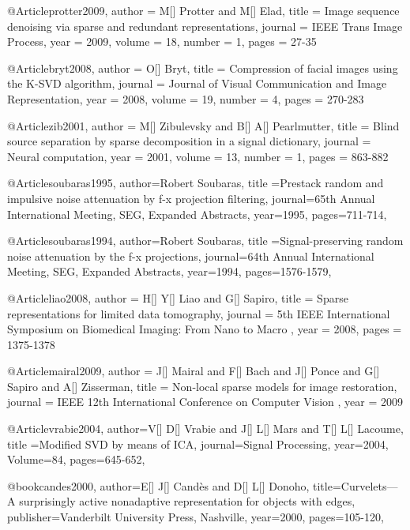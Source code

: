{@Article{protter2009,
  author = 	 {M[] Protter and M[] Elad},
  title = 	 {Image sequence denoising via sparse and redundant representations},
  journal = 	 {IEEE Trans Image Process},
  year = 	 2009,
  volume = 	 18,
  number = 	 1,
  pages = 	 {27-35}}

@Article{bryt2008,
  author = 	 {O[] Bryt},
  title = 	 {Compression of facial images using the {K}-{SVD} algorithm},
  journal = 	 {Journal of Visual Communication and Image Representation},
  year = 	 2008,
  volume = 	 19,
  number = 	 4,
  pages = 	 {270-283}}

@Article{zib2001,
  author = 	 {M[] Zibulevsky and B[] A[] Pearlmutter},
  title = 	 {Blind source separation by sparse decomposition in a signal dictionary},
  journal = 	 {Neural computation},
  year = 	 2001,
  volume = 	 13,
  number = 	 1,
  pages = 	 {863-882}}

@Article{soubaras1995,
  author={Robert Soubaras},
  title ={Prestack random and impulsive noise attenuation by f-x projection filtering},
  journal={65th Annual International Meeting, SEG, Expanded Abstracts},
  year=1995,
  pages={711-714},
}

@Article{soubaras1994,
  author={Robert Soubaras},
  title ={Signal-preserving random noise attenuation by the f-x projections},
  journal={64th Annual International Meeting, SEG, Expanded Abstracts},
  year=1994,
  pages={1576-1579},
}

@Article{liao2008,
  author = 	 {H[] Y[] Liao and G[] Sapiro},
  title = 	 {Sparse representations for limited data tomography},
  journal = 	 {5th IEEE International Symposium on Biomedical Imaging: From Nano to Macro },
  year = 	 2008,
  pages = 	 {1375-1378}}

@Article{mairal2009,
  author = 	 {J[] Mairal and F[] Bach and J[] Ponce and G[] Sapiro and A[] Zisserman},
  title = 	 {Non-local sparse models for image restoration},
  journal = 	 {IEEE 12th International Conference on Computer Vision  },
  year = 	 2009}


@Article{vrabie2004,
  author={V[] D[] Vrabie and J[] L[] Mars and T[] L[] Lacoume},
  title ={Modified SVD by means of ICA},
  journal={Signal Processing},
  year=2004,
  Volume=84,
  pages={645-652},
}

@book{candes2000,
  author={E[] J[] Cand\`{e}s and D[] L[] Donoho},
  title={Curvelets—A surprisingly active nonadaptive representation for objects with edges},
  publisher={Vanderbilt University Press, Nashville},
  year=2000,
    pages={105-120},
}




}
